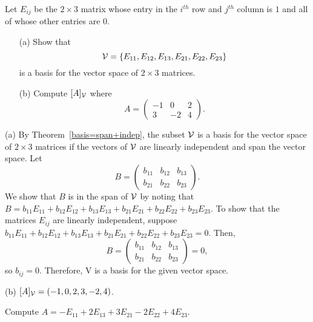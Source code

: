 \documentclass{ximera}
\begin{document}
\begin{exercise} \label{c7.1.3}
Let $E_{ij}$ be the $2\times 3$ matrix whose entry in the
$i^{th}$ row and $j^{th}$ column is $1$ and all of whose
other entries are $0$.
\begin{itemize}
\item[(a)]  Show that
\[
{\cal V}=\{E_{11},E_{12},E_{13},E_{21},E_{22},E_{23}\}
\]
is a basis for the vector space of $2\times 3$ matrices.
\item[(b)]   Compute $[A]_{\cal V}$ where
\[
A=\left(\begin{array}{rrr} -1 & 0 & 2\\ 3 & -2 & 4\end{array}\right).
\]
\end{itemize}

\begin{solution}

(a) By Theorem~\ref{basis=span+indep},
the subset ${\cal V}$ is a basis for the vector space of $2 \times
3$ matrices if the vectors of ${\cal V}$ are linearly independent and
span the vector space.  Let
\[ B = \left(\begin{array}{rrr} b_{11} & b_{12} & b_{13} \\ b_{21} &
b_{22} & b_{23} \end{array}\right). \]
We show that $B$ is in the span of ${\cal V}$ by noting that
$B = b_{11}E_{11} + b_{12}E_{12} + b_{13}E_{13} + b_{21}E_{21}
+ b_{22}E_{22} + b_{23}E_{23}$.  To show that the matrices $E_{ij}$
are linearly independent, suppose $b_{11}E_{11} + b_{12}E_{12} +
b_{13}E_{13} + b_{21}E_{21} + b_{22}E_{22} + b_{23}E_{23} = 0$.  Then,
\[  B = \left(\begin{array}{rrr} b_{11} & b_{12} & b_{13} \\ b_{21} &
b_{22} & b_{23} \end{array}\right) = 0, \]
so $b_{ij} = 0$.
Therefore, {\cal V} is a basis for the given vector space.

(b) \ans $[A]_{\cal V} = (-1,0,2,3,-2,4)$.

\soln Compute $A = -E_{11} + 2E_{13} + 3E_{21} - 2E_{22} + 4E_{23}$.

\end{solution}
\end{exercise}
\end{document}
